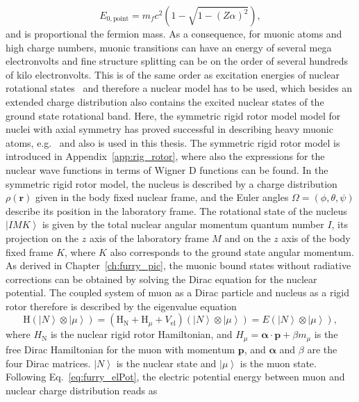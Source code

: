 \begin{equation}
E_{0,\text{point}}=m_f c^2 (1-\sqrt{1-(Z\alpha)^2}),
\end{equation}
and is proportional the fermion mass. As a consequence, for muonic atoms and high charge numbers, muonic transitions can have an energy of several mega electronvolts and fine structure splitting can be on the order of several hundreds of kilo electronvolts. This is of the same order as excitation energies of nuclear rotational states~\cite{ENSDF} and therefore a nuclear model has to be used, which besides an extended charge distribution also contains the excited nuclear states of the ground state rotational band. Here, the symmetric rigid rotor model model for nuclei with axial symmetry has proved successful in describing heavy muonic atoms, e.g.~\cite{tanaka1984,hitlin1970,wu1969,Devons1995} and also is used in this thesis. The symmetric rigid rotor model is introduced in Appendix~\ref{app:rig_rotor}, where also the expressions for the nuclear wave functions in terms of Wigner D functions can be found. In the symmetric rigid rotor model, the nucleus is described by a charge distribution $\rho(\mathbf{r})$ given in the body fixed nuclear frame, and the Euler angles $\Omega=(\phi,\theta,\psi)$ describe its position in the laboratory frame. The rotational state of the nucleus $\left|IMK\right>$ is given by the total nuclear angular momentum quantum number $I$, its projection on the $z$ axis of the laboratory frame $M$ and on the $z$ axis of the body fixed frame $K$, where $K$ also corresponds to the ground state angular momentum. As derived in Chapter~\ref{ch:furry_pic}, the muonic bound states without radiative corrections can be obtained by solving the Dirac equation for the nuclear potential. The coupled system of muon as a Dirac particle and nucleus as a rigid rotor therefore is described by the eigenvalue equation
\begin{equation}
\text{H} \left(\left|N\right>\otimes \left|\mu\right>\right)= \left(\text{H}_{\text{N}} + \text{H}_\mu + V_{\text{el}}\right) \left(\left|N\right>\otimes \left|\mu\right>\right)= E \left(\left|N\right>\otimes \left|\mu\right>\right),
\label{eq:muon_htotal}
\end{equation}
where $H_{\text{N}}$ is the nuclear rigid rotor Hamiltonian, and ${H_\mu}{=}{\boldsymbol{\alpha} \cdot \mathbf{p} + \beta m_\mu}$ is the free Dirac Hamiltonian for the muon with momentum $\mathbf{p}$, and $\boldsymbol{\alpha}$ and $\beta$ are the four Dirac matrices. $\left|N\right>$ is the nuclear state and $\left|\mu\right>$ is the muon state. Following Eq.~\eqref{eq:furry_elPot}, the electric potential energy between muon and nuclear charge distribution reads as
